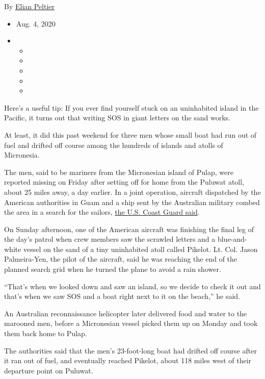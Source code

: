 By \href{https://www.nytimes3xbfgragh.onion/by/elian-peltier}{Elian
Peltier}

\begin{itemize}
\item
  Aug. 4, 2020
\item
  \begin{itemize}
  \item
  \item
  \item
  \item
  \item
  \end{itemize}
\end{itemize}

Here's a useful tip: If you ever find yourself stuck on an uninhabited
island in the Pacific, it turns out that writing SOS in giant letters on
the sand works.

At least, it did this past weekend for three men whose small boat had
run out of fuel and drifted off course among the hundreds of islands and
atolls of Micronesia.

The men, said to be mariners from the Micronesian island of Pulap, were
reported missing on Friday after setting off for home from the Puluwat
atoll, about 25 miles away, a day earlier. In a joint operation,
aircraft dispatched by the American authorities in Guam and a ship sent
by the Australian military combed the area in a search for the sailors,
\href{https://www.dvidshub.net/news/375188/coast-guard-partners-rescue-three-stranded-mariners-island-federated-states-micronesia}{the
U.S. Coast Guard said}.

On Sunday afternoon, one of the American aircraft was finishing the
final leg of the day's patrol when crew members saw the scrawled letters
and a blue-and-white vessel on the sand of a tiny uninhabited atoll
called Pikelot. Lt. Col. Jason Palmeira-Yen, the pilot of the aircraft,
said he was reaching the end of the planned search grid when he turned
the plane to avoid a rain shower.

``That's when we looked down and saw an island, so we decide to check it
out and that's when we saw SOS and a boat right next to it on the
beach,'' he said.

An Australian reconnaissance helicopter later delivered food and water
to the marooned men, before a Micronesian vessel picked them up on
Monday and took them back home to Pulap.

The authorities said that the men's 23-foot-long boat had drifted off
course after it ran out of fuel, and eventually reached Pikelot, about
118 miles west of their departure point on Puluwat.

